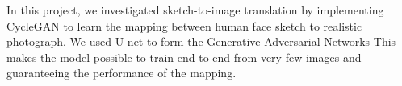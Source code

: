 
In this project, we investigated sketch-to-image translation by implementing CycleGAN to learn the mapping between human face sketch to realistic photograph. We used U-net to form the Generative Adversarial Networks This makes the model possible to train end to end from very few images and guaranteeing the performance of the mapping. %


